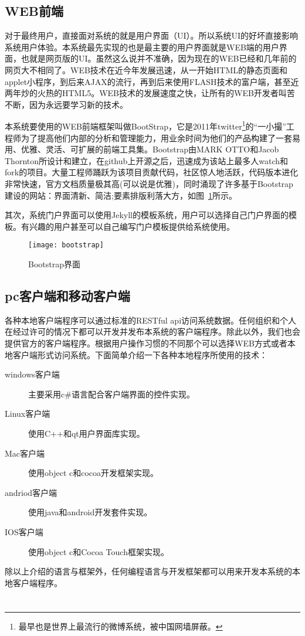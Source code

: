 \subsection{WEB前端}
\label{sec:webui}

对于最终用户，直接面对系统的就是用户界面（UI）。所以系统UI的好坏直接影响系统用户体验。本系统最先实现的也是最主要的用户界面就是WEB端的用户界面，也就是网页版的UI。虽然这么说并不准确，因为现在的WEB已经和几年前的网页大不相同了。WEB技术在近今年发展迅速，从一开始HTML的静态页面和applet小程序，到后来AJAX的流行，再到后来使用FLASH技术的富户端，甚至近两年炒的火热的HTML5。WEB技术的发展速度之快，让所有的WEB开发者叫苦不断，因为永远要学习新的技术。

本系统要使用的WEB前端框架叫做BootStrap，它是2011年twitter\footnote{最早也是世界上最流行的微博系统，被中国网墙屏蔽。}的“一小撮”工程师为了提高他们内部的分析和管理能力，用业余时间为他们的产品构建了一套易用、优雅、灵活、可扩展的前端工具集。Bootstrap由MARK OTTO和Jacob Thornton所设计和建立，在github上开源之后，迅速成为该站上最多人watch和fork的项目。大量工程师踊跃为该项目贡献代码，社区惊人地活跃，代码版本进化非常快速，官方文档质量极其高(可以说是优雅)，同时涌现了许多基于Bootstrap建设的网站：界面清新、简洁;要素排版利落大方，如图~\ref{fig:xfig14}所示。

其次，系统门户界面可以使用Jekyll的模板系统，用户可以选择自己门户界面的模板。有兴趣的用户甚至可以自己编写门户模板提供给系统使用。

\begin{figure}[H]
  \centering
  \texttt{[image: bootstrap]}
  \caption{Bootstrap界面}
  \label{fig:xfig14}
\end{figure}

\subsection{pc客户端和移动客户端}
\label{sec:pcandriodmac}

各种本地客户端程序可以通过标准的RESTful api访问系统数据。任何组织和个人在经过许可的情况下都可以开发并发布本系统的客户端程序。除此以外，我们也会提供官方的客户端程序。根据用户操作习惯的不同那个可以选择WEB方式或者本地客户端形式访问系统。下面简单介绍一下各种本地程序所使用的技术：
\begin{description}
\item[windows客户端] 主要采用c\#语言配合客户端界面的控件实现。
\item[Linux客户端] 使用C++和qt用户界面库实现。
\item[Mac客户端] 使用object c和cocoa开发框架实现。
\item[andriod客户端] 使用java和android开发套件实现。
\item[IOS客户端] 使用object c和Cocoa Touch框架实现。
\end{description}

除以上介绍的语言与框架外，任何编程语言与开发框架都可以用来开发本系统的本地客户端程序。

\section{}
\label{sec:smarkdownsyntax}
